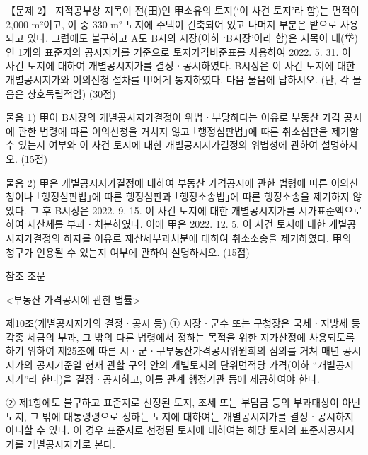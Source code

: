 \begin{longquestion}{【문제 2】}
지적공부상 지목이 전(田)인 甲소유의 토지(‘이 사건 토지’라 함)는 면적이 2,000 m²이고, 이 중 330 m² 토지에 주택이 건축되어 있고 나머지 부분은 밭으로 사용되고 있다. 그럼에도 불구하고 A도 B시의 시장(이하 ‘B시장’이라 함)은 지목이 대(垈)인 1개의 표준지의 공시지가를 기준으로 토지가격비준표를 사용하여 2022. 5. 31. 이 사건 토지에 대하여 개별공시지가를 결정ㆍ공시하였다. B시장은 이 사건 토지에 대한 개별공시지가와 이의신청 절차를 甲에게 통지하였다. 다음 물음에 답하시오. (단, 각 물음은 상호독립적임) (30점) \par
\medskip\noindent 물음 1) 甲이 B시장의 개별공시지가결정이 위법ㆍ부당하다는 이유로 부동산 가격 공시에 관한 법령에 따른 이의신청을 거치지 않고 ｢행정심판법｣에 따른 취소심판을 제기할 수 있는지 여부와 이 사건 토지에 대한 개별공시지가결정의 위법성에 관하여 설명하시오. (15점) \par
\medskip\noindent 물음 2) 甲은 개별공시지가결정에 대하여 부동산 가격공시에 관한 법령에 따른 이의신청이나 ｢행정심판법｣에 따른 행정심판과 ｢행정소송법｣에 따른 행정소송을 제기하지 않았다. 그 후 B시장은 2022. 9. 15. 이 사건 토지에 대한 개별공시지가를 시가표준액으로 하여 재산세를 부과ㆍ처분하였다. 이에 甲은 2022. 12. 5. 이 사건 토지에 대한 개별공시지가결정의 하자를 이유로 재산세부과처분에 대하여 취소소송을 제기하였다. 甲의 청구가 인용될 수 있는지 여부에 관하여 설명하시오. (15점) \par
\begin{framedtext}
참조 조문 \par
<부동산 가격공시에 관한 법률> \par
제10조(개별공시지가의 결정ㆍ공시 등) ① 시장ㆍ군수 또는 구청장은 국세ㆍ지방세 등 각종 세금의 부과, 그 밖의 다른 법령에서 정하는 목적을 위한 지가산정에 사용되도록 하기 위하여 제25조에 따른 시ㆍ군ㆍ구부동산가격공시위원회의 심의를 거쳐 매년 공시지가의 공시기준일 현재 관할 구역 안의 개별토지의 단위면적당 가격(이하 “개별공시지가”라 한다)을 결정ㆍ공시하고, 이를 관계 행정기관 등에 제공하여야 한다. \par
② 제1항에도 불구하고 표준지로 선정된 토지, 조세 또는 부담금 등의 부과대상이 아닌 토지, 그 밖에 대통령령으로 정하는 토지에 대하여는 개별공시지가를 결정ㆍ공시하지 아니할 수 있다. 이 경우 표준지로 선정된 토지에 대하여는 해당 토지의 표준지공시지가를 개별공시지가로 본다. \par

\end{framedtext}
\end{longquestion}
